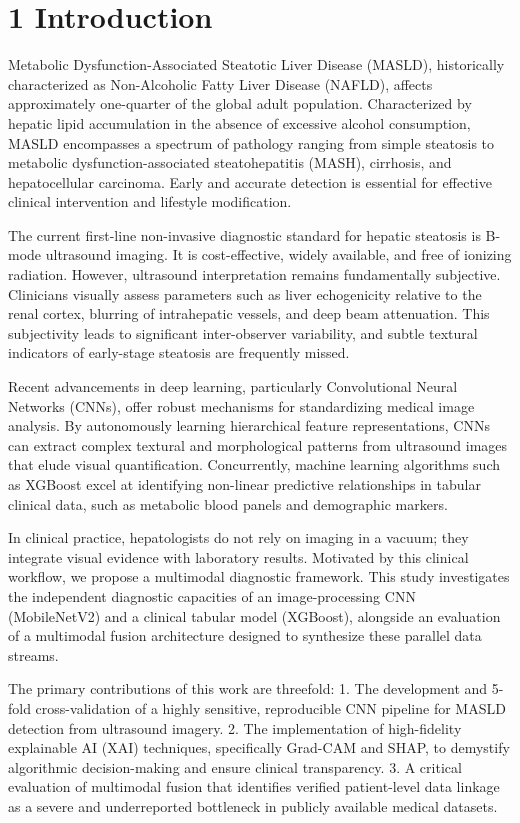 \section{1 Introduction}\label{introduction}

Metabolic Dysfunction-Associated Steatotic Liver Disease (MASLD),
historically characterized as Non-Alcoholic Fatty Liver Disease (NAFLD),
affects approximately one-quarter of the global adult population.
Characterized by hepatic lipid accumulation in the absence of excessive
alcohol consumption, MASLD encompasses a spectrum of pathology ranging
from simple steatosis to metabolic dysfunction-associated
steatohepatitis (MASH), cirrhosis, and hepatocellular carcinoma. Early
and accurate detection is essential for effective clinical intervention
and lifestyle modification.

The current first-line non-invasive diagnostic standard for hepatic
steatosis is B-mode ultrasound imaging. It is cost-effective, widely
available, and free of ionizing radiation. However, ultrasound
interpretation remains fundamentally subjective. Clinicians visually
assess parameters such as liver echogenicity relative to the renal
cortex, blurring of intrahepatic vessels, and deep beam attenuation.
This subjectivity leads to significant inter-observer variability, and
subtle textural indicators of early-stage steatosis are frequently
missed.

Recent advancements in deep learning, particularly Convolutional Neural
Networks (CNNs), offer robust mechanisms for standardizing medical image
analysis. By autonomously learning hierarchical feature representations,
CNNs can extract complex textural and morphological patterns from
ultrasound images that elude visual quantification. Concurrently,
machine learning algorithms such as XGBoost excel at identifying
non-linear predictive relationships in tabular clinical data, such as
metabolic blood panels and demographic markers.

In clinical practice, hepatologists do not rely on imaging in a vacuum;
they integrate visual evidence with laboratory results. Motivated by
this clinical workflow, we propose a multimodal diagnostic framework.
This study investigates the independent diagnostic capacities of an
image-processing CNN (MobileNetV2) and a clinical tabular model
(XGBoost), alongside an evaluation of a multimodal fusion architecture
designed to synthesize these parallel data streams.

The primary contributions of this work are threefold: 1. The development
and 5-fold cross-validation of a highly sensitive, reproducible CNN
pipeline for MASLD detection from ultrasound imagery. 2. The
implementation of high-fidelity explainable AI (XAI) techniques,
specifically Grad-CAM and SHAP, to demystify algorithmic decision-making
and ensure clinical transparency. 3. A critical evaluation of multimodal
fusion that identifies verified patient-level data linkage as a severe
and underreported bottleneck in publicly available medical datasets.

